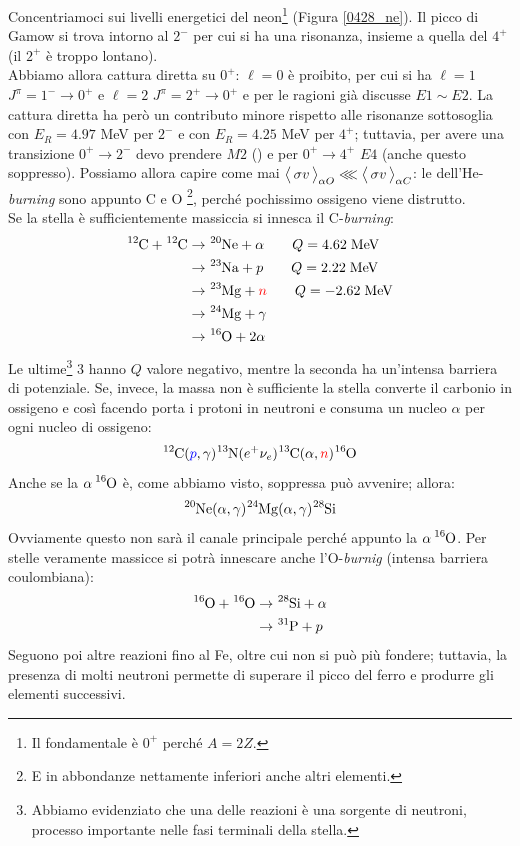 \noindent Concentriamoci sui livelli energetici del neon\footnote{Il fondamentale è $0^+$ perché $A=2Z$.} (Figura \ref{0428_ne}). Il picco di Gamow si trova intorno al $2^-$ per cui si ha una risonanza, insieme a quella del $4^+$ (il $2^+$ è troppo lontano).\\
\noindent Abbiamo allora cattura diretta su $0^+$: $\ell=0$ è proibito, per cui si ha $\ell=1$ $J^\pi=1^-\to0^+$ e $\ell=2$ $J^\pi=2^+\to0^+$ e per le ragioni già discusse $E1\sim E2$. La cattura diretta ha però un contributo minore rispetto alle risonanze sottosoglia con $E_R =4.97$ MeV per $2^-$ e con $E_R =4.25$ MeV per $4^+$; tuttavia, per avere una transizione $0^+\to2^-$ devo prendere $M2$ () e per $0^+\to4^+$ $E4$ (anche questo soppresso). Possiamo allora capire come mai $\bigl\langle\, \sigma v\, \bigr\rangle_{\alpha O}\lll\bigl\langle\, \sigma v\, \bigr\rangle_{\alpha C}$: le  dell'He-\textit{burning} sono appunto C e O \footnote{E in abbondanze nettamente inferiori anche altri elementi.}, perché pochissimo ossigeno viene distrutto. \\ 
Se la stella è sufficientemente massiccia si innesca il C-\textit{burning}:
\begin{align*}
	\ce{^{12}C} +\ce{^{12}C} &\to \ce{^{20}Ne}+ \alpha \qquad Q=4.62 \unit{MeV} \\
	&\to \ce{^{23}Na}+ p \qquad Q=2.22 \unit{MeV} \\ 
	&\to \ce{^{23}Mg}+ \textcolor{red}{n} \qquad Q=-2.62 \unit{MeV} \\ 
	&\to \ce{^{24}Mg}+ \gamma \\ 
	&\to \ce{^{16}O}+ 2\alpha  
\end{align*}
Le ultime\footnote{Abbiamo evidenziato che una delle reazioni è una sorgente di neutroni, processo importante nelle fasi terminali della stella.} 3 hanno $Q$ valore negativo, mentre la seconda ha un'intensa barriera di potenziale. Se, invece, la massa non è sufficiente la stella converte il carbonio in ossigeno e così facendo porta i protoni in neutroni e consuma un nucleo $\alpha$ per ogni nucleo di ossigeno:
$$\ce{^{12}C}(\textcolor{blue}{p},\gamma)\ce{^{13}N}(e^+\nu_e)\ce{^{13}C}(\alpha,\textcolor{red}{n})\ce{^{16}O}$$
Anche se la $\alpha \, \ce{^{16}O}$ è, come abbiamo visto, soppressa può avvenire; allora:
$$\ce{^{20}Ne}(\alpha,\gamma)\ce{^{24}Mg}(\alpha,\gamma)\ce{^{28}Si}$$
Ovviamente questo non sarà il canale principale perché appunto la $\alpha \, \ce{^{16}O}$. Per stelle veramente massicce si potrà innescare anche l'O-\textit{burnig} (intensa barriera coulombiana):
\begin{align*}
	\ce{^{16}O} + \ce{^{16}O} &\to \ce{^{28}Si} +\alpha \\
	&\to \ce{^{31}P} + p
\end{align*}
Seguono poi altre reazioni fino al Fe, oltre cui non si può più fondere; tuttavia, la presenza di molti neutroni permette di superare il picco del ferro e produrre gli elementi successivi.


